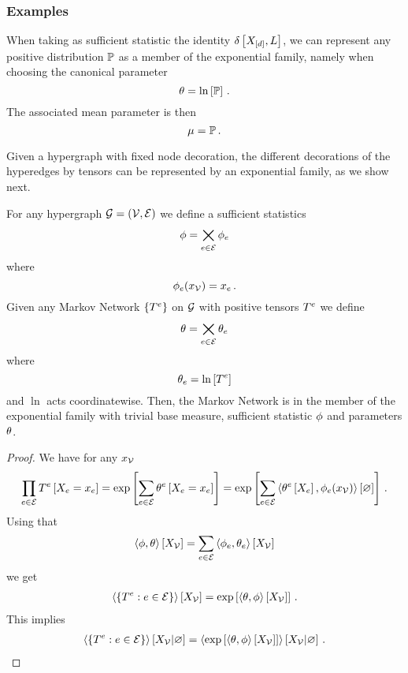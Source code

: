 \subsubsection{Examples}

\begin{example}\label{exa:naiveExpFamily}
	When taking as sufficient statistic the identity $\delta\left[X_{[d]},L\right]$, we can represent any positive distribution $\mathbb{P}$ as a member of the exponential family, namely when choosing the canonical parameter
		\[ \theta = \ln \left[ \mathbb{P} \right] \, . \]
	The associated mean parameter is then
		\[ \mu = \mathbb{P} \, . \]
\end{example}


Given a hypergraph with fixed node decoration, the different decorations of the hyperedges by tensors can be represented by an exponential family, as we show next.

\begin{theorem}
	For any hypergraph $\mathcal{G}=(\mathcal{V},\mathcal{E})$ we define a sufficient statistics 
		\[ \phi = \bigtimes_{e\in\mathcal{E}}  \phi_{e} \]
	where 
		\[ \phi_{e}(x_{\mathcal{V}}) = x_{e} \, . \]
	Given any Markov Network $\{T^{e}\}$ on $\mathcal{G}$ with positive tensors $T^{e}$ we define
		\[ \theta = \bigtimes_{e\in\mathcal{E}} \theta_{e} \]
	where
		\[ \theta_{e} =  \ln\left[ T^{e} \right] \]
	and $\ln$ acts coordinatewise.
	Then, the Markov Network is in the member of the exponential family with trivial base measure, sufficient statistic $\phi$ and parameters $\theta$.
\end{theorem}
\begin{proof}
	We have for any $x_{\mathcal{V}}$
	\begin{align}
	\prod_{e\in\mathcal{E}} T^{e}\left[X_{e}=x_{e}\right]
		= \mathrm{exp}\left[\sum_{e\in\mathcal{E}} \theta^{e}\left[X_{e}=x_{e}\right]\right]
		= \mathrm{exp}\left[\sum_{e\in\mathcal{E}} \left\langle \theta^{e}\left[X_{e}\right],\phi_{e}(x_{\mathcal{V}})\right\rangle \left[ \varnothing \right]\right]  \, .
	\end{align}
	Using that
		\[ \left\langle \phi,\theta\right\rangle \left[ X_{\mathcal{V}} \right] = \sum_{e\in\mathcal{E}} \left\langle \phi_{e},\theta_{e}\right\rangle \left[ X_{\mathcal{V}} \right] \]
	we get
	\begin{align}
		\left\langle \{T^{e}: e\in\mathcal{E}\}\right\rangle \left[ X_{\mathcal{V}} \right] = \mathrm{exp}\left[\left\langle \theta,\phi\right\rangle \left[ X_{\mathcal{V}} \right]\right] \, .
	\end{align}
	This implies 
	\begin{align}
		\left\langle \{T^{e}: e\in\mathcal{E}\}\right\rangle \left[ X_{\mathcal{V}} | \varnothing \right] = \left\langle \mathrm{exp}\left[\left\langle \theta,\phi\right\rangle \left[ X_{\mathcal{V}} \right]\right]\right\rangle \left[ X_{\mathcal{V}} | \varnothing \right] \, .
	\end{align}
\end{proof}


